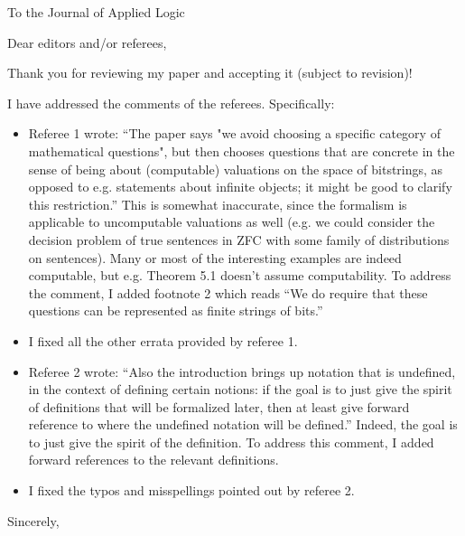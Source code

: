 \documentclass{letter}
\begin{document}


\address{}

\begin{letter}{To the Journal of Applied Logic} %

\opening{Dear editors and/or referees,}

Thank you for reviewing my paper and accepting it (subject to revision)!

I have addressed the comments of the referees. Specifically:

\begin{itemize}
\item 
Referee 1 wrote: \enquote{The paper says "we avoid choosing a specific category of mathematical 
questions", but then chooses questions that are concrete in the sense of 
being about (computable) valuations on the space of bitstrings, as 
opposed to e.g. statements about infinite objects; it might be good to 
clarify this restriction.} This is somewhat inaccurate, since the formalism is applicable to uncomputable valuations as well (e.g. we could consider the decision problem of true sentences in ZFC with some family of distributions on sentences). Many or most of the interesting examples are indeed computable, but e.g. Theorem 5.1 doesn't assume computability. To address the comment, I added footnote 2 which reads \enquote{We do require that these questions can be represented as finite strings of bits.}
\item I fixed all the other errata provided by referee 1.
\item Referee 2 wrote: \enquote{Also the introduction brings up notation that is 
undefined, in the context of defining certain notions: if the goal is to 
just give the spirit of definitions that will be formalized later, then 
at least give forward reference to where the undefined notation will be 
defined.} Indeed, the goal is to just give the spirit of the definition. To address this comment, I added forward references to the relevant definitions.
\item I fixed the typos and misspellings pointed out by referee 2.
\end{itemize}

\signature{Vadim Kosoy}
\closing{Sincerely,}




\end{letter}
\end{document}
